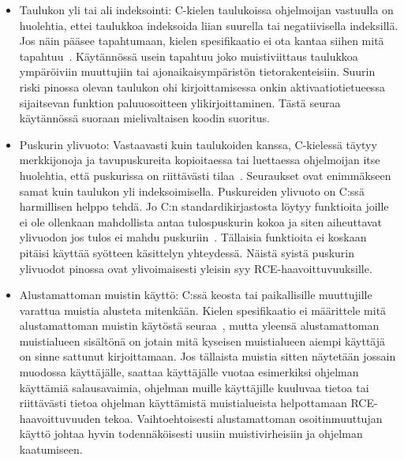 \begin{itemize}
    \item Taulukon yli tai ali indeksointi: C-kielen taulukoissa ohjelmoijan vastuulla on huolehtia,
          ettei taulukkoa indeksoida liian suurella tai negatiivisella indeksillä.
          Jos näin pääsee tapahtumaan, kielen spesifikaatio ei ota kantaa siihen mitä tapahtuu~\cite[6.5.6]{CSpec}.
          Käytännössä usein tapahtuu joko muistiviittaus taulukkoa ympäröiviin muuttujiin tai
          ajonaikaisympäristön tietorakenteisiin.
          Suurin riski pinossa olevan taulukon ohi kirjoittamisessa onkin aktivaatiotietueessa
          sijaitsevan funktion paluuosoitteen ylikirjoittaminen.
          Tästä seuraa käytännössä suoraan mielivaltaisen koodin suoritus.
    \item Puskurin ylivuoto: Vastaavasti kuin taulukoiden kanssa,
          C-kielessä täytyy merkkijonoja ja tavupuskureita kopioitaessa tai luettaessa
          ohjelmoijan itse huolehtia, että puskurissa on riittävästi tilaa~\cite[7.24.1]{CSpec}.
          Seuraukset ovat enimmäkseen samat kuin taulukon yli indeksoimisella.
          Puskureiden ylivuoto on C:ssä harmillisen helppo tehdä.
          Jo C:n standardikirjastosta löytyy funktioita joille ei ole ollenkaan mahdollista antaa tulospuskurin
          kokoa ja siten aiheuttavat ylivuodon jos tulos ei mahdu puskuriin~\cite{StaticallyDetecting}.
          Tällaisia funktioita ei koskaan pitäisi käyttää syötteen käsittelyn yhteydessä.
          Näistä syistä puskurin ylivuodot pinossa ovat ylivoimaisesti yleisin syy RCE-haavoittuvuuksille.
    \item Alustamattoman muistin käyttö: C:ssä keosta tai paikallisille muuttujille varattua muistia
          alusteta mitenkään.
          Kielen spesifikaatio ei määrittele mitä alustamattoman muistin käytöstä seuraa~\cite[6.3.2.1, 7.22.3.4]{CSpec},
          mutta yleensä alustamattoman muistialueen sisältönä on jotain mitä kyseisen muistialueen aiempi käyttäjä on
          sinne sattunut kirjoittamaan.
%
          Jos tällaista muistia sitten näytetään jossain muodossa käyttäjälle,
          saattaa käyttäjälle vuotaa esimerkiksi ohjelman käyttämiä salausavaimia,
          ohjelman muille käyttäjille kuuluvaa tietoa tai
          riittävästi tietoa ohjelman käyttämistä muistialueista helpottamaan RCE-haavoittuvuuden tekoa.
          Vaihtoehtoisesti alustamattoman osoitinmuuttujan käyttö johtaa hyvin todennäköisesti uusiin muistivirheisiin
          ja ohjelman kaatumiseen.

\end{itemize}
